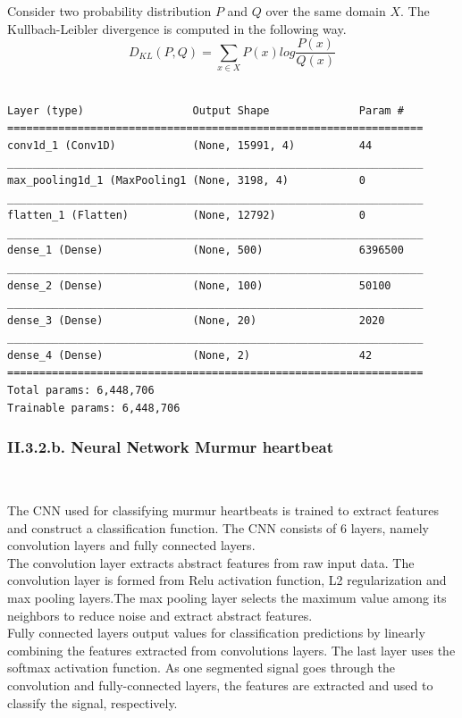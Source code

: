 \documentclass[11pt, a4papper]{report}
\theoremstyle{plain}
\theoremstyle{definition}
\theoremstyle{definition}
\theoremstyle{proposition}
\begin{document}
Consider two probability distribution $P$ and $Q$ over the same domain $X$. The Kullbach-Leibler divergence is computed in the following way.
$$ D_{KL}(P, Q) = \sum_{x \in X} P(x) log \frac{P(x)}{Q(x)} $$
\

\begin{verbatim}
Layer (type)                 Output Shape              Param #   
=================================================================
conv1d_1 (Conv1D)            (None, 15991, 4)          44        
_________________________________________________________________
max_pooling1d_1 (MaxPooling1 (None, 3198, 4)           0         
_________________________________________________________________
flatten_1 (Flatten)          (None, 12792)             0         
_________________________________________________________________
dense_1 (Dense)              (None, 500)               6396500   
_________________________________________________________________
dense_2 (Dense)              (None, 100)               50100     
_________________________________________________________________
dense_3 (Dense)              (None, 20)                2020      
_________________________________________________________________
dense_4 (Dense)              (None, 2)                 42        
=================================================================
Total params: 6,448,706
Trainable params: 6,448,706
\end{verbatim}



\subsubsection*{II.3.2.b. Neural Network Murmur heartbeat}

\

The CNN used for classifying murmur heartbeats is trained to extract features and construct a classification function. The CNN consists of 6 layers, namely convolution layers and fully connected layers.
\\

The convolution layer extracts abstract features from raw input data. The convolution layer is formed from Relu activation function, L2 regularization and max pooling layers.The max pooling layer selects the maximum value among its neighbors to reduce noise and extract abstract features.
\\

Fully connected layers output values for classification predictions by linearly combining the features extracted from convolutions layers. The last layer uses the softmax activation function. As one segmented signal goes through the convolution and fully-connected layers, the features are extracted and used to classify the signal, respectively.
\\
\end{document}
